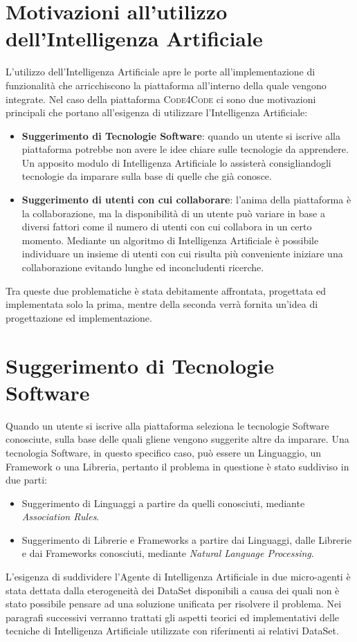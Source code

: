 \section{Motivazioni all'utilizzo dell'Intelligenza Artificiale} %
L'utilizzo dell'Intelligenza Artificiale apre le porte all'implementazione di funzionalità che arricchiscono la piattaforma all'interno della quale vengono integrate. Nel caso della piattaforma \textsc{Code4Code} ci sono due motivazioni principali che portano all'esigenza di utilizzare l'Intelligenza Artificiale:
\begin{itemize}
    \item{\textbf{Suggerimento di Tecnologie Software}: quando un utente si iscrive alla piattaforma potrebbe non avere le idee chiare sulle tecnologie da apprendere. Un apposito modulo di Intelligenza Artificiale lo assisterà consigliandogli tecnologie da imparare sulla base di quelle che già conosce.}
    \item{\textbf{Suggerimento di utenti con cui collaborare}: l'anima della piattaforma è la collaborazione, ma la disponibilità di un utente può variare in base a diversi fattori come il numero di utenti con cui collabora in un certo momento. Mediante un algoritmo di Intelligenza Artificiale è possibile individuare un insieme di utenti con cui risulta più conveniente iniziare una collaborazione evitando lunghe ed inconcludenti ricerche.}
\end{itemize}
Tra queste due problematiche è stata debitamente affrontata, progettata ed implementata solo la prima, mentre della seconda verrà fornita un'idea di progettazione ed implementazione.
\section{Suggerimento di Tecnologie Software} %
Quando un utente si iscrive alla piattaforma seleziona le tecnologie Software conosciute, sulla base delle quali gliene vengono suggerite altre da imparare. Una tecnologia Software, in questo specifico caso, può essere un Linguaggio, un Framework o una Libreria, pertanto il problema in questione è stato suddiviso in due parti: 
\begin{itemize}
    \item Suggerimento di Linguaggi a partire da quelli conosciuti, mediante \emph{Association Rules}.
    \item Suggerimento di Librerie e Frameworks a partire dai Linguaggi, dalle Librerie e dai Frameworks conosciuti, mediante \emph{Natural Language Processing}. 
\end{itemize}
L'esigenza di suddividere l'Agente di Intelligenza Artificiale in due micro-agenti è stata dettata dalla eterogeneità dei DataSet disponibili a causa dei quali non è stato possibile pensare ad una soluzione unificata per risolvere il problema. Nei paragrafi successivi verranno trattati gli aspetti teorici ed implementativi delle tecniche di Intelligenza Artificiale utilizzate con riferimenti ai relativi DataSet.
